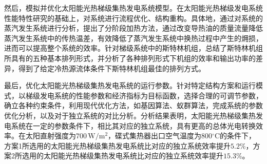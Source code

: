 {然后，模拟并优化太阳能光热梯级集热发电系统模型。在太阳能光热梯级发电系统性能特性研究的基础上，对系统进行流程优化、结构重构。具体地，通过对系统的蒸汽发生系统进行分析，提出了分阶段加热方法，通过改变导热油的质量流量降低蒸汽发生系统中的传热温差，有效降低了蒸汽发生系统中换热过程中产生的㶲损，进而可以提高整个系统的效率。针对梯级系统中的斯特林机组，总结了斯特林机组所具有的五种基本排列形式，并分析了各种排列形式下机组的效率和输出功率的差异，得到了给定冷热源流体条件下斯特林机组最佳的排列方式。

最后，优化太阳能光热梯级集热发电系统的运行参数。针对特定结构方案和运行模式，以梯级发电系统的性能参数和经济指标为目标函数，选择合理的可调节参数，确立各种约束条件，利用现代优化方法，如基因算法、蚁群算法，完成系统的参数优化分析，以及对于独立系统的对比分析。分析结果表明，太阳能光热梯级集热发电系统在一定的参数条件下，相比其对应的独立系统，具有更高的总体光电转换效率。在太阳直射强度为$700\,\mathrm{W/m^2}$，碟式集热器出口空气温度为$800\mathrm{^\circ C}$的条件下，方案1所选用的太阳能光热梯级集热发电系统比对应的独立系统效率提升$5.2\%$，方案2所选用的太阳能光热梯级集热发电系统比对应的独立系统效率提升$15.3\%$。

}

